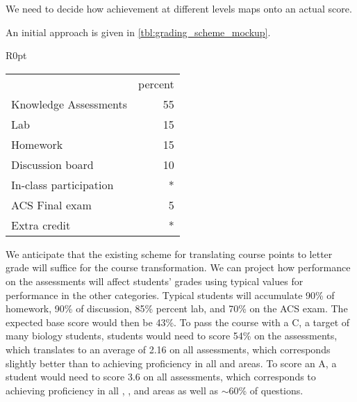 \documentclass[10pt,letterpaper]{article}
\begin{document}
 We need to decide how achievement at different levels maps onto an actual score. 

An initial approach is given in \cref{tbl:grading_scheme_mockup}.
\begin{wraptable}{R}{0pt}
\begin{tabular}{lr}
&percent\\
Knowledge Assessments & 55\\
Lab  & 15\\
Homework  & 15\\
Discussion board  & 10\\
In-class participation  & *\\ 
ACS Final exam  & 5\\
Extra credit  & *
\end{tabular}
\caption{\label{tbl:grading_scheme_mockup}
The revised point structure will be quite similar to the existing point distribution.} 
\end{wraptable}

We anticipate that the existing scheme for translating course points to letter grade will suffice for the course transformation. We can project how performance on the assessments will affect students' grades using typical values for performance in the other categories. Typical students will accumulate 90\% of homework, 90\% of discussion, 85\% percent lab, and 70\% on the ACS exam. The expected base score would then be 43\%. To pass the course with a C, a target of many biology students, students would need to score  54\% on the assessments, which translates to an average of 2.16 on all assessments, which corresponds slightly better than to achieving proficiency in all \recall and \comprehension areas. To score an A, a student would need to score 3.6 on all assessments, which corresponds to achieving proficiency in all \recall, \comprehension, and \analysis areas as well as $\sim60$\% of \use questions. 
\end{document}
